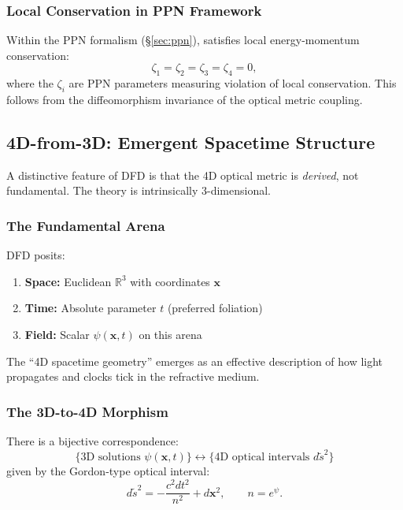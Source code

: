 \subsubsection{Local Conservation in PPN Framework}

Within the PPN formalism (\S\ref{sec:ppn}), \DFD satisfies local 
energy-momentum conservation:
\begin{equation}
\zeta_1 = \zeta_2 = \zeta_3 = \zeta_4 = 0,
\end{equation}
where the $\zeta_i$ are PPN parameters measuring violation of local 
conservation. This follows from the diffeomorphism invariance of the 
optical metric coupling.

\subsection{4D-from-3D: Emergent Spacetime Structure}\label{sec:emergent-4d}

A distinctive feature of DFD is that the 4D optical metric is \emph{derived}, 
not fundamental. The theory is intrinsically 3-dimensional.

\subsubsection{The Fundamental Arena}

DFD posits:
\begin{enumerate}
\item \textbf{Space:} Euclidean $\mathbb{R}^3$ with coordinates $\mathbf{x}$
\item \textbf{Time:} Absolute parameter $t$ (preferred foliation)
\item \textbf{Field:} Scalar $\psi(\mathbf{x}, t)$ on this arena
\end{enumerate}

The ``4D spacetime geometry'' emerges as an effective description of how 
light propagates and clocks tick in the refractive medium.

\subsubsection{The 3D-to-4D Morphism}

\begin{theorem}
There is a bijective correspondence:
\begin{equation}
\{\text{3D solutions } \psi(\mathbf{x}, t)\} \longleftrightarrow 
\{\text{4D optical intervals } d\tilde{s}^2\}
\end{equation}
given by the Gordon-type optical interval:
\begin{equation}\label{eq:gordon-metric}
d\tilde{s}^2 = -\frac{c^2 dt^2}{n^2} + d\mathbf{x}^2, \qquad n = e^\psi.
\end{equation}
\end{theorem}

